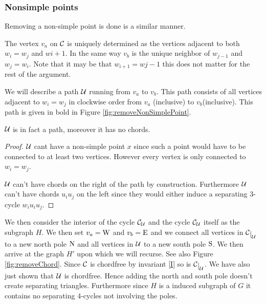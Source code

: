 \subsubsection{Nonsimple points}

Removing a non-simple point is done is a similar manner.


The vertex $v_a$ on $\mathcal{C}$ is uniquely determined as the vertices adjacent to both $w_i=w_j$ and $w{i+1}$. In the same way $v_b$ is the unique neighbor of $w_{j-1}$ and $w_j=w_i$. Note that it may be that $w_{i+1} = w{j-1}$ this does not matter for the rest of the argument. 

We will describe a path $\mathcal{U}$ running from $v_a$ to $v_b$. This path consists of all vertices adjacent to $w_i = w_j$ in clockwise order from $v_a$ (inclusive) to $v_b$(inclusive). This path is given in bold in Figure \ref{fig:removeNonSimplePoint}. 

\begin{lemma}
$\mathcal{U}$ is in fact a path, moreover it has no chords.
\end{lemma}
\begin{proof}
$\mathcal{U}$ cant have a non-simple point $x$ since such a point would have to be connected to at least two vertices. However every vertex is only connected to $w_i=w_j$.

$\mathcal{U}$ can't have chords on the right of the path by construction. Furthermore $\mathcal{U}$ can't have chords $u_i u_j$ on the left since they would either induce a separating $3$-cycle $w_i u_i u_j$.
\end{proof}


We then consider the interior of the cycle $\mathcal{C}_{\mathcal{U}}$ and the cycle $\mathcal{C}_{\mathcal{U}}$ itself as the subgraph $H$. We then set $v_a = \mathrm{W}$ and $v_b = \mathrm{E}$ and we connect all vertices in $\restC{\U}$ to a new north pole $\mathrm{N}$ and all vertices in $\mathcal{U}$ to a new south pole $\mathrm{S}$. We then arrive at the graph $H'$ upon which we will recurse. See also Figure \ref{fig:removeChord}. Since $\mathcal{C}$ is chordfree by invariant \ref{I}  so is $\restC{\U}$. We have also just shown that $\mathcal{U}$ is chordfree. Hence adding the north and south pole doesn't create separating triangles. Furthermore since $H$ is a induced subgraph of $G$ it contains no separating $4$-cycles not involving the poles.   


